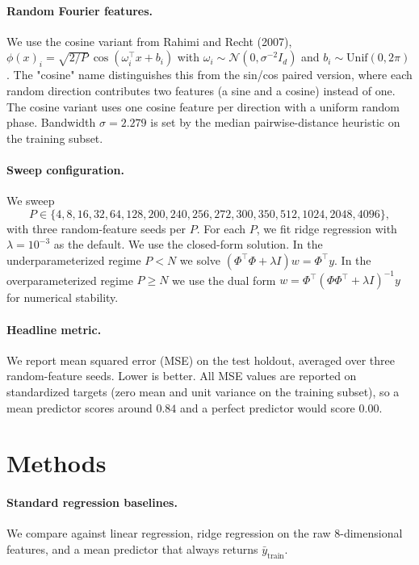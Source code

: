 \documentclass{article}
\begin{document}
\paragraph{Random Fourier features.}
We use the cosine variant from Rahimi and Recht (2007), $\phi(x)_i = \sqrt{2/P}\, \cos(\omega_i^\top x + b_i)$ with $\omega_i \sim \mathcal{N}(0, \sigma^{-2} I_d)$ and $b_i \sim \mathrm{Unif}(0, 2\pi)$. The "cosine" name distinguishes this from the sin/cos paired version, where each random direction contributes two features (a sine and a cosine) instead of one. The cosine variant uses one cosine feature per direction with a uniform random phase. Bandwidth $\sigma = 2.279$ is set by the median pairwise-distance heuristic on the training subset.

\paragraph{Sweep configuration.}
We sweep
\[
P \in \{4, 8, 16, 32, 64, 128, 200, 240, 256, 272, 300, 350, 512, 1024, 2048, 4096\},
\]
with three random-feature seeds per $P$. For each $P$, we fit ridge regression with $\lambda = 10^{-3}$ as the default. We use the closed-form solution. In the underparameterized regime $P < N$ we solve $(\Phi^\top \Phi + \lambda I) w = \Phi^\top y$. In the overparameterized regime $P \geq N$ we use the dual form $w = \Phi^\top (\Phi \Phi^\top + \lambda I)^{-1} y$ for numerical stability.

\paragraph{Headline metric.}
We report mean squared error (MSE) on the test holdout, averaged over three random-feature seeds. Lower is better. All MSE values are reported on standardized targets (zero mean and unit variance on the training subset), so a mean predictor scores around $0.84$ and a perfect predictor would score $0.00$.

\section{Methods}

\paragraph{Standard regression baselines.}
We compare against linear regression, ridge regression on the raw $8$-dimensional features, and a mean predictor that always returns $\bar{y}_{\text{train}}$.
\end{document}
